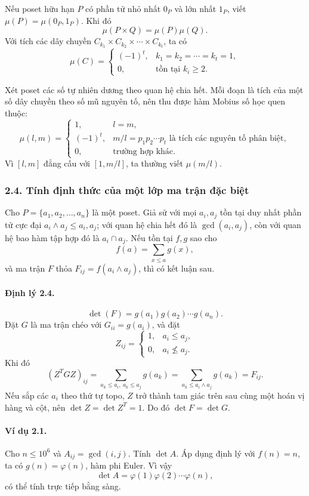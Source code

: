 \documentclass[11pt]{article}
\begin{document}
Nếu poset hữu hạn \(P\) có phần tử nhỏ nhất \(0_P\) và lớn nhất \(1_P\), viết
\(\mu(P)=\mu(0_P,1_P)\). Khi đó
\[
\mu(P\times Q)=\mu(P)\mu(Q).
\]
Với tích các dây chuyền \(C_{k_1}\times C_{k_2}\times\cdots\times C_{k_t}\),
ta có
\[
\mu(C)=
\begin{cases}
(-1)^t,&k_1=k_2=\cdots=k_t=1,\\
0,&\text{tồn tại }k_i\ge2.
\end{cases}
\]

Xét poset các số tự nhiên dương theo quan hệ chia hết. Mỗi đoạn là tích của
một số dây chuyền theo số mũ nguyên tố, nên thu được hàm Mobius số học quen
thuộc:
\[
\mu(l,m)=
\begin{cases}
1,&l=m,\\
(-1)^t,&m/l=p_1p_2\cdots p_t\text{ là tích các nguyên tố phân biệt},\\
0,&\text{trường hợp khác}.
\end{cases}
\]
Vì \([l,m]\) đẳng cấu với \([1,m/l]\), ta thường viết \(\mu(m/l)\).

\subsubsection*{2.4. Tính định thức của một lớp ma trận đặc biệt}

Cho \(P=\{a_1,a_2,\ldots,a_n\}\) là một poset. Giả sử với mọi \(a_i,a_j\) tồn
tại duy nhất phần tử cực đại \(a_i\wedge a_j\le a_i,a_j\); với quan hệ chia
hết đó là \(\gcd(a_i,a_j)\), còn với quan hệ bao hàm tập hợp đó là
\(a_i\cap a_j\). Nếu tồn tại \(f,g\) sao cho
\[
f(a)=\sum_{x\le a}g(x),
\]
và ma trận \(F\) thỏa \(F_{ij}=f(a_i\wedge a_j)\), thì có kết luận sau.

\paragraph{Định lý 2.4.}
\[
\det(F)=g(a_1)g(a_2)\cdots g(a_n).
\]
Đặt \(G\) là ma trận chéo với \(G_{ii}=g(a_i)\), và đặt
\[
Z_{ij}=
\begin{cases}
1,&a_i\le a_j,\\
0,&a_i\nleq a_j.
\end{cases}
\]
Khi đó
\[
(Z^TGZ)_{ij}=\sum_{a_k\le a_i,\ a_k\le a_j}g(a_k)
=\sum_{a_k\le a_i\wedge a_j}g(a_k)=F_{ij}.
\]
Nếu sắp các \(a_i\) theo thứ tự topo, \(Z\) trở thành tam giác trên sau cùng
một hoán vị hàng và cột, nên \(\det Z=\det Z^T=1\). Do đó
\(\det F=\det G\).

\paragraph{Ví dụ 2.1.}
Cho \(n\le10^6\) và \(A_{ij}=\gcd(i,j)\). Tính \(\det A\). Áp dụng định lý với
\(f(n)=n\), ta có \(g(n)=\varphi(n)\), hàm phi Euler. Vì vậy
\[
\det A=\varphi(1)\varphi(2)\cdots\varphi(n),
\]
có thể tính trực tiếp bằng sàng.
\end{document}
